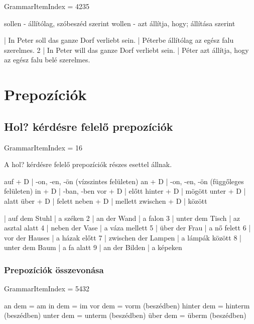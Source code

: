 \documentclass{article}
\newenvironment{desc}{\verbatim}{\endverbatim}
\newenvironment{exmp}{\verbatim}{\endverbatim}
\begin{document}
GrammarItemIndex = 4235

\begin{desc}

sollen - állítólag, szóbeszéd szerint
wollen - azt állítja, hogy; állítása szerint

\end{desc}

\begin{exmp}
1 | In Peter soll das ganze Dorf verliebt sein. | Péterbe állítólag az egész falu szerelmes.
2 | In Peter will das ganze Dorf verliebt sein. | Péter azt állítja, hogy az egész falu belé szerelmes.
\end{exmp}

\section{Prepozíciók}

\subsection{Hol? kérdésre felelő prepozíciók}

GrammarItemIndex = 16

\begin{desc}
A hol? kérdésre felelő prepozíciók részes esettel állnak.


auf + D | -on, -en, -ön (vízszintes felületen)
an + D | -on, -en, -ön (függőleges felületen)
in + D | -ban, -ben
vor + D | előtt
hinter + D | mögött
unter + D | alatt
über + D | felett
neben + D | mellett
zwischen + D | között

\end{desc}

\begin{exmp}
1 | auf dem Stuhl | a széken
2 | an der Wand | a falon
3 | unter dem Tisch | az asztal alatt
4 | neben der Vase | a váza mellett
5 | über der Frau | a nő felett
6 | vor der Hauses | a házak előtt
7 | zwischen der Lampen | a lámpák között
8 | unter dem Baum | a fa alatt
9 | an der Bilden | a képeken
\end{exmp}

\subsubsection{Prepozíciók összevonása}

GrammarItemIndex = 5432

\begin{desc}
an dem = am
in dem = im
vor dem = vorm (beszédben)
hinter dem = hinterm (beszédben)
unter dem = unterm (beszédben)
über dem = überm (beszédben)
\end{desc}
\end{document}
